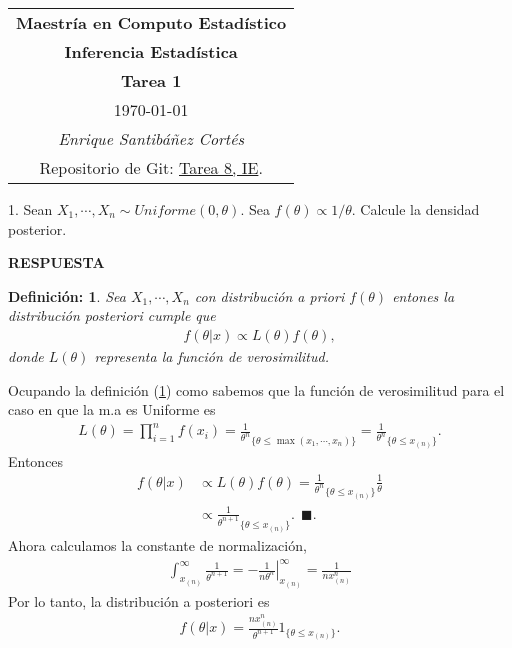 \documentclass[11pt,letterpaper]{article}
\newcommand{\res}{\textbf{RESPUESTA}\\}
\newcommand{\finf}{\blacksquare.}
\newtheorem{thmd}{Definición:}
\begin{document}
\begin{table}[ht]
\centering
\begin{tabular}{c}
\textbf{Maestría en Computo Estadístico}\\
\textbf{Inferencia Estadística} \\
\textbf{Tarea 1}\\
\today \\
\emph{Enrique Santibáñez Cortés}\\
Repositorio de Git: \href{https://github.com/Enriquesec/Inferencia_Estad-stica/tree/master/Tareas/Tarea_8}{Tarea 8, IE}.
\end{tabular}
\end{table}

1. Sean $X_1,\cdots,X_n\sim Uniforme(0,\theta)$. Sea $f(\theta)\propto 1/\theta$. Calcule la densidad posterior.

\res \begin{framed}
    \begin{thmd} \label{d_priori}
	Sea $X_1,\cdots, X_n$ con distribución a priori $f(\theta)$ entones la distribución posteriori cumple que 
	\begin{align*}
	f(\theta|x) \propto L(\theta) f(\theta),
	\end{align*}
	donde $L(\theta)$ representa la función de verosimilitud.
    \end{thmd}
\end{framed}
Ocupando la definición (\ref{d_priori}) como sabemos que la función de verosimilitud para el caso en que la m.a es Uniforme es
\begin{align*}
L(\theta) = \prod_{i=1}^n f(x_i) = \frac{1}{\theta^n}_{\{\theta \leq \max(x_1,\cdots, x_n)  \}} = \frac{1}{\theta^n}_{\{\theta \leq  x_{(n)} \}}.
\end{align*}
Entonces
\begin{align*}
	f(\theta|x)& \propto L(\theta) f(\theta)=\frac{1}{\theta^n}_{\{\theta \leq  x_{(n)}\}} \frac{1}{\theta}\\
	&\propto \frac{1}{\theta^{n+1}}_{\{\theta \leq  x_{(n)} \}}. \ \ \finf
\end{align*}
Ahora calculamos la constante de normalización,
\begin{align*}
\int_{x_(n)}^\infty  \frac{1}{\theta^{n+1}} =\left. -\frac{1}{n\theta^n} \right|_{x_{(n)}}^\infty = \frac{1}{nx_{(n)}^n}
\end{align*}
Por lo tanto, la distribución a posteriori es
\begin{align*}
f(\theta|x)= \frac{nx_{(n)}^n}{\theta^{n+1}}1_{\{\theta \leq  x_{(n)} \}}.
\end{align*}
\end{document}
